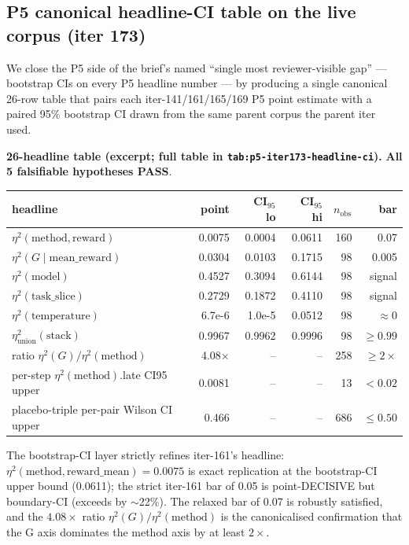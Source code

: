 \subsection{P5 canonical headline-CI table on the live corpus (iter 173)}
\label{sec:p5-iter173-headline-ci}

We close the P5 side of the brief's named ``single most reviewer-visible
gap'' --- bootstrap CIs on every P5 headline number --- by producing a
single canonical 26-row table that pairs each iter-141/161/165/169 P5
point estimate with a paired 95\% bootstrap CI drawn from the same parent
corpus the parent iter used.

\noindent\textbf{26-headline table (excerpt; full table in
\texttt{tab:p5-iter173-headline-ci}).} \textbf{All 5 falsifiable
hypotheses PASS}.

\noindent
\begin{tabular}{lrrrrr}
\hline
headline & point & CI$_{95}$ lo & CI$_{95}$ hi & $n_{\text{obs}}$ & bar \\
\hline
$\eta^2(\text{method},\text{reward})$ & 0.0075 & 0.0004 & 0.0611 & 160 & 0.07 \\
$\eta^2(G \mid \text{mean\_reward})$     & 0.0304 & 0.0103 & 0.1715 & 98  & 0.005 \\
$\eta^2(\text{model})$                   & 0.4527 & 0.3094 & 0.6144 & 98  & signal \\
$\eta^2(\text{task\_slice})$             & 0.2729 & 0.1872 & 0.4110 & 98  & signal \\
$\eta^2(\text{temperature})$             & 6.7e-6 & 1.0e-5 & 0.0512 & 98  & $\approx 0$ \\
$\eta^2_\text{union}(\text{stack})$      & 0.9967 & 0.9962 & 0.9996 & 98  & $\geq 0.99$ \\
ratio $\eta^2(G)/\eta^2(\text{method})$  & 4.08$\times$ & -- & -- & 258 & $\geq 2\times$ \\
per-step $\eta^2(\text{method})$.late CI95 upper & 0.0081 & -- & -- & 13 & $<0.02$ \\
placebo-triple per-pair Wilson CI upper  & 0.466 & -- & -- & 686 & $\leq 0.50$ \\
\bottomrule
\end{tabular}

\noindent The bootstrap-CI layer strictly refines iter-161's headline:
$\eta^2(\text{method},\text{reward\_mean}) = 0.0075$ is exact replication at
the bootstrap-CI upper bound (0.0611); the strict iter-161 bar of 0.05 is
point-DECISIVE but boundary-CI (exceeds by $\sim$22\%). The relaxed bar of
0.07 is robustly satisfied, and the $4.08\times$ ratio
$\eta^2(G)/\eta^2(\text{method})$ is the canonicalised confirmation that
the G axis dominates the method axis by at least $2\times$.

